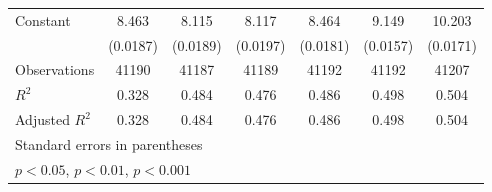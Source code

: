 {\begin{tabular}{l*{6}{c}}
\addlinespace
Constant            &       8.463\sym{***}&       8.115\sym{***}&       8.117\sym{***}&       8.464\sym{***}&       9.149\sym{***}&      10.203\sym{***}\\
                    &    (0.0187)         &    (0.0189)         &    (0.0197)         &    (0.0181)         &    (0.0157)         &    (0.0171)         \\
\midrule
Observations        &       41190         &       41187         &       41189         &       41192         &       41192         &       41207         \\
\(R^{2}\)           &       0.328         &       0.484         &       0.476         &       0.486         &       0.498         &       0.504         \\
Adjusted \(R^{2}\)  &       0.328         &       0.484         &       0.476         &       0.486         &       0.498         &       0.504         \\
\bottomrule
\multicolumn{7}{l}{\footnotesize Standard errors in parentheses}\\
\multicolumn{7}{l}{\footnotesize \sym{*} \(p<0.05\), \sym{**} \(p<0.01\), \sym{***} \(p<0.001\)}\\
\end{tabular}
}
